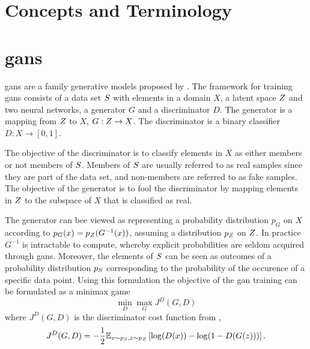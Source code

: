\section{Concepts and Terminology}


\section{\acrlong{gans}}
\acrfull{gans} are a family generative models proposed by \textcite{goodfellow2014generative}. The framework for training \acrshort{gans} consists of a data set $S$ with elements in a domain $X$, a latent space $Z$ and two neural networks, a generator $G$ and a discriminator $D$. The generator is a mapping from $Z$ to $X$, $G: Z \rightarrow X$. The discriminator is a binary classifier $D: X \rightarrow [0, 1]$. 

The objective of the discriminator is to classify elements in $X$ as either members or not members of $S$. Members of $S$ are usually referred to as real samples since they are part of the data set, and non-members are referred to as fake samples. The objective of the generator is to fool the discriminator by mapping elements in $Z$ to the subspace of $X$ that is classified as real. 

The generator can bee viewed as representing a probability distribution $p_G$ on $X$ according to $p_G(x) = p_Z(G^{-1}(x))$, assuming a distribution $p_Z$ on $Z$. In practice $G^{-1}$ is intractable to compute, whereby explicit probabilities are seldom acquired through \acrshort{gans}. Moreover, the elements of $S$ can be seen as outcomes of a probability distribution $p_S$ corresponding to the probability of the occurence of a specific data point. Using this formulation the objective of the \acrshort{gan} training can be formulated as a minimax game 
\begin{equation}
    \min_D \max_G J^{D}(G, D)
\end{equation}
where $J^D(G, D)$ is the discriminator cost function from \parencite{goodfellow2016nips},
\begin{equation}
    J^D(G, D) = -\frac{1}{2}\mathbb{E}_{x \sim p_S, z \sim p_Z}\left[\log(D(x)) - \log(1 - D(G(z))) \right].
\end{equation}


